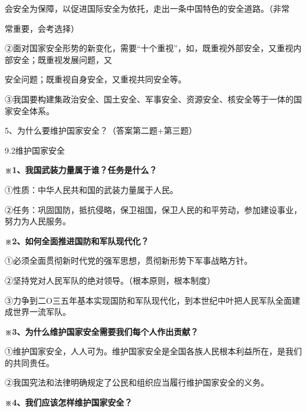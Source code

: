 \documentclass[lang=cn,11pt]{elegantbook}
\newcommand{\daofasym}[1]{{\daofasymbolfont #1}}
\newcommand{\daofasym}[1]{#1}
\begin{document}
会安全为保障，以促进国际安全为依托，走出一条中国特色的安全道路。（非常\par

常重要，会考选择）\par

\daofasym{②}面对国家安全形势的新变化，需要“十个重视”，如，既重视外部安全，又重视内部安全；既重视发展问题，又\par

安全问题；既重视自身安全，又重视共同安全等。\par

\daofasym{③}我国要构建集政治安全、国土安全、军事安全、资源安全、核安全等于一体的国家安全体系。\par

5、为什么要维护国家安全？（答案第二题+第三题）\par

9.2维护国家安全\par

\textbf{※1、我国武装力量属于谁？任务是什么？}\par

\daofasym{①}性质：中华人民共和国的武装力量属于人民。\par

\daofasym{②}任务：巩固国防，抵抗侵略，保卫祖国，保卫人民的和平劳动，参加建设事业，努力为人民服务。\par

\textbf{※2、如何全面推进国防和军队现代化？}\par

\daofasym{①}必须全面贯彻新时代党的强军思想，贯彻新形势下军事战略方针。\par

\daofasym{②}坚持党对人民军队的绝对领导。（根本原则，根本制度）\par

\daofasym{③}力争到二O三五年基本实现国防和军队现代化，到本世纪中叶把人民军队全面建成世界一流军队。\par

\textbf{※3、为什么维护国家安全需要我们每个人作出贡献？}\par

\daofasym{①}维护国家安全，人人可为。维护国家安全是全国各族人民根本利益所在，是我们的共同贵任。\par

\daofasym{②}我国究法和法律明确规定了公民和组织应当履行维护国家安全的义务。\par

\textbf{※4、我们应该怎样维护国家安全？}\par
\end{document}
